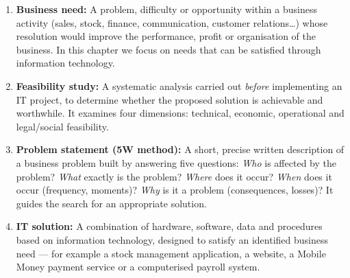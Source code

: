 \documentclass[11pt]{article}
\begin{document}
\begin{corrige}
\begin{enumerate}
\item \textbf{Business need:} A problem, difficulty or opportunity within a business activity (sales, stock, finance, communication, customer relations\ldots) whose resolution would improve the performance, profit or organisation of the business. In this chapter we focus on needs that can be satisfied through information technology.
\item \textbf{Feasibility study:} A systematic analysis carried out \emph{before} implementing an IT project, to determine whether the proposed solution is achievable and worthwhile. It examines four dimensions: technical, economic, operational and legal/social feasibility.
\item \textbf{Problem statement (5W method):} A short, precise written description of a business problem built by answering five questions: \emph{Who} is affected by the problem? \emph{What} exactly is the problem? \emph{Where} does it occur? \emph{When} does it occur (frequency, moments)? \emph{Why} is it a problem (consequences, losses)? It guides the search for an appropriate solution.
\item \textbf{IT solution:} A combination of hardware, software, data and procedures based on information technology, designed to satisfy an identified business need — for example a stock management application, a website, a Mobile Money payment service or a computerised payroll system.
\end{enumerate}
\end{corrige}
\end{document}
